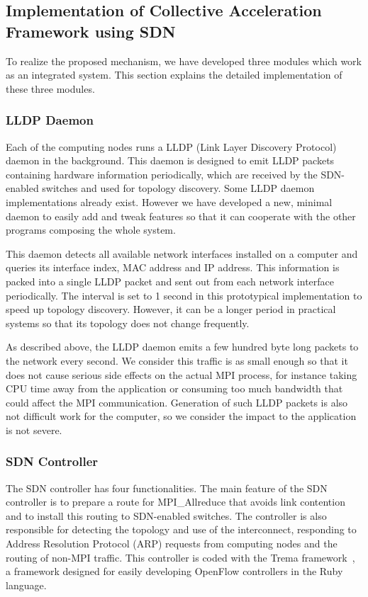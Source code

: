 \subsection{Implementation of Collective Acceleration Framework using SDN}

To realize the proposed mechanism, we have developed three modules which
work as an integrated system. This section explains the detailed
implementation of these three modules.

\subsubsection{LLDP Daemon}

Each of the computing nodes runs a LLDP (Link Layer Discovery
Protocol)~\autocite{lldp} daemon in the background. This daemon is designed to
emit LLDP packets containing hardware information periodically, which are
received by the SDN-enabled switches and used for topology discovery. Some
LLDP daemon implementations already exist. However we have developed a new,
minimal daemon to easily add and tweak features so that it can cooperate with
the other programs composing the whole system.

This daemon detects all available network interfaces installed on a
computer and queries its interface index, MAC address and IP address.
This information is packed into a single LLDP packet and sent out from
each network interface periodically. The interval is set to 1 second in
this prototypical implementation to speed up topology discovery.
However, it can be a longer period in practical systems so that its
topology does not change frequently.

As described above, the LLDP daemon emits a few hundred byte long
packets to the network every second. We consider this traffic is as
small enough so that it does not cause serious side effects on the
actual MPI process, for instance taking CPU time away from the
application or consuming too much bandwidth that could affect the MPI
communication. Generation of such LLDP packets is also not difficult
work for the computer, so we consider the impact to the application is
not severe.

\subsubsection{SDN Controller}

The SDN controller has four functionalities. The main feature of the SDN
controller is to prepare a route for MPI\_Allreduce that avoids
link contention and to install this routing to SDN-enabled switches. The
controller is also responsible for detecting the topology and use of the
interconnect, responding to Address Resolution Protocol (ARP) requests
from computing nodes and the routing of non-MPI traffic. This controller
is coded with the Trema framework~\autocite{trema}, a framework designed for
easily developing OpenFlow controllers in the Ruby language.

